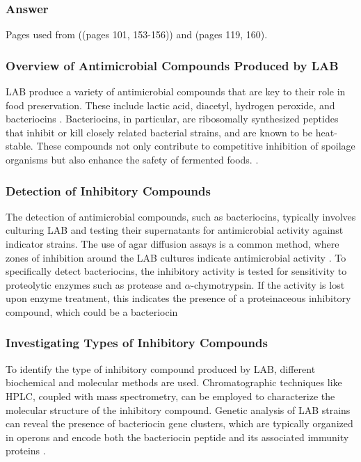 \subsubsection*{Answer}
Pages used from \cite*{L3-LAB} ((pages 101, 153-156)) and \cite*{L8-MicroInFood} (pages 119, 160).
\subsubsection*{Overview of Antimicrobial Compounds Produced by LAB}
LAB produce a variety of antimicrobial compounds that are key to their role in food preservation. These include lactic acid, diacetyl, hydrogen peroxide, and bacteriocins \cite*{L3-LAB}. Bacteriocins, in particular, are ribosomally synthesized peptides that inhibit or kill closely related bacterial strains, and are known to be heat-stable. These compounds not only contribute to competitive inhibition of spoilage organisms but also enhance the safety of fermented foods. \cite*{L3-LAB}.

\subsubsection*{Detection of Inhibitory Compounds}
The detection of antimicrobial compounds, such as bacteriocins, typically involves culturing LAB and testing their supernatants for antimicrobial activity against indicator strains. The use of agar diffusion assays is a common method, where zones of inhibition around the LAB cultures indicate antimicrobial activity \cite*{L3-LAB}. To specifically detect bacteriocins, the inhibitory activity is tested for sensitivity to proteolytic enzymes such as protease and $\alpha$-chymotrypsin. If the activity is lost upon enzyme treatment, this indicates the presence of a proteinaceous inhibitory compound, which could be a bacteriocin \cite*{L3-LAB}

\subsubsection*{Investigating Types of Inhibitory Compounds}
To identify the type of inhibitory compound produced by LAB, different biochemical and molecular methods are used. Chromatographic techniques like HPLC, coupled with mass spectrometry, can be employed to characterize the molecular structure of the inhibitory compound. Genetic analysis of LAB strains can reveal the presence of bacteriocin gene clusters, which are typically organized in operons and encode both the bacteriocin peptide and its associated immunity proteins \cite*{L3-LAB}.

